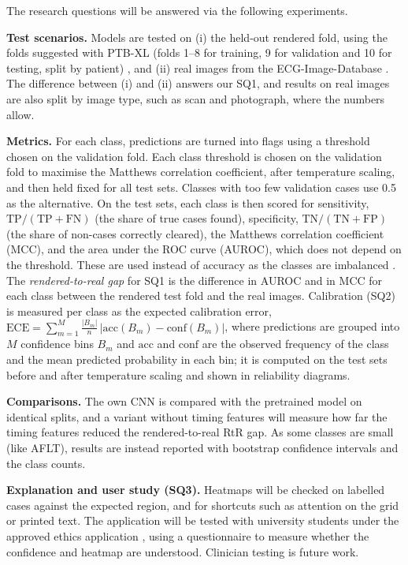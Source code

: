 The research questions will be answered via the following experiments.

\textbf{Test scenarios.} Models are tested on (i) the held-out rendered fold, using the
folds suggested with PTB-XL (folds 1--8 for training, 9 for validation and 10 for testing,
split by patient) \cite{wagner_ptbxl_2020}, and (ii) real images from the
ECG-Image-Database \cite{reyna_ecg-image-database_2024}. The difference between (i) and (ii)
answers our SQ1, and results on real images are also split by image type, such as scan and
photograph, where the numbers allow.

\textbf{Metrics.} For each class, predictions are turned into flags using a threshold
chosen on the validation fold. Each class threshold is chosen on the validation fold to maximise the Matthews correlation coefficient, after temperature scaling, and then held fixed for all test sets. Classes with too few validation cases use 0.5 as the alternative. On the
test sets, each class is then scored for sensitivity, $\mathrm{TP}/(\mathrm{TP}+\mathrm{FN})$
(the share of true cases found), specificity, $\mathrm{TN}/(\mathrm{TN}+\mathrm{FP})$ (the
share of non-cases correctly cleared), the Matthews correlation coefficient (MCC), and the
area under the ROC curve (AUROC), which does not depend on the threshold. These are used
instead of accuracy as the classes are imbalanced \cite{chicco_advantages_2020}. The
\emph{rendered-to-real gap} for SQ1 is the difference in AUROC and in MCC for each class
between the rendered test fold and the real images.
Calibration (SQ2) is measured per class as the expected calibration error,
$\mathrm{ECE}=\sum_{m=1}^{M}\frac{|B_m|}{n}\,|\mathrm{acc}(B_m)-\mathrm{conf}(B_m)|$,
where predictions are grouped into $M$ confidence bins $B_m$ and $\mathrm{acc}$ and
$\mathrm{conf}$ are the observed frequency of the class and the mean predicted probability in
each bin; it is computed on the test sets before and after temperature scaling and shown in
reliability diagrams.

\textbf{Comparisons.} The own CNN is compared with the pretrained model on identical splits,
and a variant without timing features will measure how far the timing features reduced the rendered-to-real RtR gap. As some classes are small
(like AFLT), results are instead reported with bootstrap confidence
intervals and the class counts.

\textbf{Explanation and user study (SQ3).} Heatmaps will be checked on labelled cases against the
expected region, and for shortcuts such as attention on the grid or printed text. The
application will be tested with university students under the approved ethics application
, using a questionnaire to measure
whether the confidence and heatmap are understood. Clinician testing is future work.

